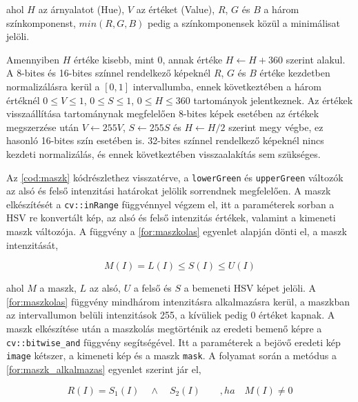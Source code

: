 \par ahol $H$ az árnyalatot (Hue), $V$ az értéket (Value), $R$, $G$ és $B$ a három színkomponenst, $min(R,G,B)$ pedig a színkomponensek közül a minimálisat jelöli.
\par Amennyiben $H$ értéke kisebb, mint $0$, annak értéke $H \leftarrow H+360$ szerint alakul. A 8-bites és 16-bites színnel rendelkező képeknél $R$, $G$ és $B$ értéke kezdetben normalizálásra kerül a $[0,1]$ intervallumba, ennek következtében a három értéknél $0 \le V \le 1$, $0 \le S \le 1$, $0 \le H \le 360$ tartományok jelentkeznek. Az értékek visszaállítása tartománynak megfelelően 8-bites képek esetében az értékek megszerzése után $V \leftarrow 255V$, $S \leftarrow 255S$ és $H \leftarrow H/2$ szerint megy végbe, ez hasonló 16-bites szín esetében is. 32-bites színnel rendelkező képeknél nincs kezdeti normalizálás, és ennek következtében visszaalakítás sem szükséges.\cite{opencv_docs}

\par Az \ref{cod:maszk} kódrészlethez visszatérve, a \lstinline{lowerGreen} és \lstinline{upperGreen} változók az alsó és felső intenzitási határokat jelölik sorrendnek megfelelően. A maszk elkészítését a \lstinline{cv::inRange} függvénnyel \cite{opencv_docs} végzem el, itt a paraméterek sorban a HSV re konvertált kép, az alsó és felső intenzitás értékek, valamint a kimeneti maszk változója.
\newline A függvény a \ref{for:maszkolas} egyenlet alapján dönti el, a maszk intenzitását,

\begin{equation}
    M(I) = L(I) \le S(I) \le U(I)
    \label{for:maszkolas}
\end{equation}

\par ahol $M$ a maszk, $L$ az alsó, $U$ a felső és $S$ a bemeneti HSV képet jelöli. A \ref{for:maszkolas} függvény mindhárom intenzitásra alkalmazásra kerül, a maszkban az intervallumon belüli intenzitások 255, a kívüliek pedig 0 értéket kapnak. A maszk elkészítése után a maszkolás megtörténik az eredeti bemenő képre a \lstinline{cv::bitwise_and} függvény \cite{opencv_docs} segítségével. Itt a paraméterek a bejövő eredeti kép \lstinline{image} kétszer, a kimeneti kép és a maszk \lstinline{mask}.
\newline A folyamat során a metódus a \ref{for:maszk_alkalmazas} egyenlet szerint jár el,

\begin{equation}
    R(I) = S_1(I)\quad \land\quad S_2(I)\qquad ,ha\quad M(I) \ne 0
    \label{for:maszk_alkalmazas}
\end{equation}

